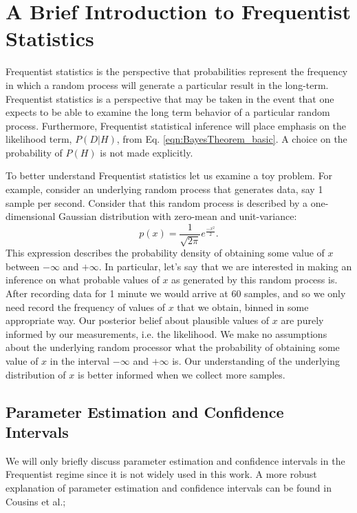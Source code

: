 \section{A Brief Introduction to Frequentist Statistics}
Frequentist statistics is the perspective that probabilities represent the frequency in which a random process will generate a particular result in the long-term. Frequentist statistics is a perspective that may be taken in the event that one expects to be able to examine the long term behavior of a particular random process. Furthermore, Frequentist statistical inference will place emphasis on the likelihood term, $P(D|H)$, from Eq. \ref{eqn:BayesTheorem_basic}. A choice on the probability of $P(H)$ is not made explicitly.

To better understand Frequentist statistics let us examine a toy problem. For example, consider an underlying random process that generates data, say 1 sample per second. Consider that this random process is described by a one-dimensional Gaussian distribution with zero-mean and unit-variance:
\begin{equation}\label{eqn:Gaussian}
    p(x) = \frac{1}{\sqrt{2\pi}} e^{\frac{-x^2}{2}}.
\end{equation}
This expression describes the probability density of obtaining some value of $x$ between $-\infty$ and $+\infty$. In particular, let's say that we are interested in making an inference on what probable values of $x$ as generated by this random process is. After recording data for 1 minute we would arrive at 60 samples, and so we only need record the frequency of values of $x$ that we obtain, binned in some appropriate way. Our posterior belief about plausible values of $x$ are purely informed by our measurements, i.e. the likelihood. We make no assumptions about the underlying random processor what the probability of obtaining some value of $x$ in the interval $-\infty$ and $+\infty$ is. Our understanding of the underlying distribution of $x$ is better informed when we collect more samples.

\subsection{Parameter Estimation and Confidence Intervals}
We will only briefly discuss parameter estimation and confidence intervals in the Frequentist regime since it is not widely used in this work. A more robust explanation of parameter estimation and confidence intervals can be found in Cousins et al.;

